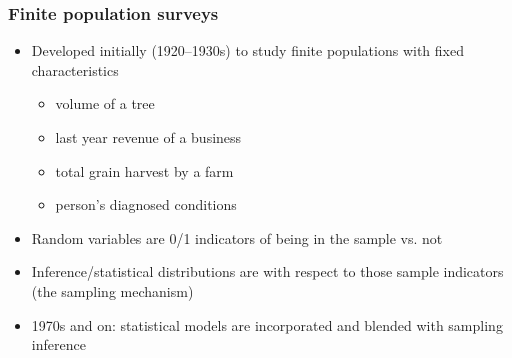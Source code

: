 \documentclass[aspectratio=43]{beamer}
\begin{document}
\begin{frame}\frametitle{Finite population surveys}

\begin{itemize}
    \item Developed initially (1920--1930s) to study finite populations with fixed characteristics
        \begin{itemize}
            \item volume of a tree
            \item last year revenue of a business
            \item total grain harvest by a farm
            \item person's diagnosed conditions
        \end{itemize}
    \item Random variables are 0/1 indicators of being in the sample vs. not
    \item Inference/statistical distributions are with respect to those sample indicators 
          (the sampling mechanism)
    \item 1970s and on: statistical models are incorporated and blended with sampling inference
\end{itemize}

\end{frame}
\end{document}
